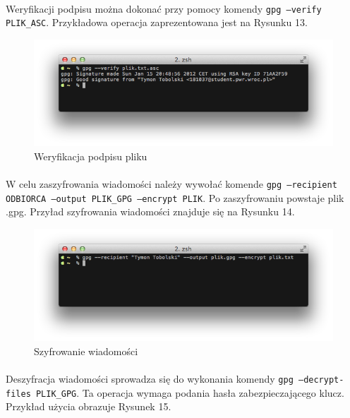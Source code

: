 \documentclass[wide,a4paper,titlepage,12pt] {article}
\begin{document}
  \paragraph{}
  Weryfikacji podpisu można dokonać przy pomocy komendy \texttt{gpg --verify PLIK\_ASC}. Przykładowa operacja zaprezentowana jest na Rysunku 13.

  \begin{figure}[h!]
    \begin{center}
      \includegraphics[width=\textwidth]{img/13.png}
      \caption{Weryfikacja podpisu pliku}
    \end{center}
  \end{figure}

  \paragraph{}
  W celu zaszyfrowania wiadomości należy wywołać komende \texttt{gpg --recipient ODBIORCA --output PLIK\_GPG --encrypt PLIK}. Po zaszyfrowaniu powstaje plik .gpg. Przyład szyfrowania wiadomości znajduje się na Rysunku 14.

  \begin{figure}[h!]
    \begin{center}
      \includegraphics[width=\textwidth]{img/14.png}
      \caption{Szyfrowanie wiadomości}
    \end{center}
  \end{figure}

  \paragraph{}
  Deszyfracja wiadomości sprowadza się do wykonania komendy \texttt{gpg --decrypt-files PLIK\_GPG}. Ta operacja wymaga podania hasła zabezpieczającego klucz. Przykład użycia obrazuje Rysunek 15.
\end{document}
